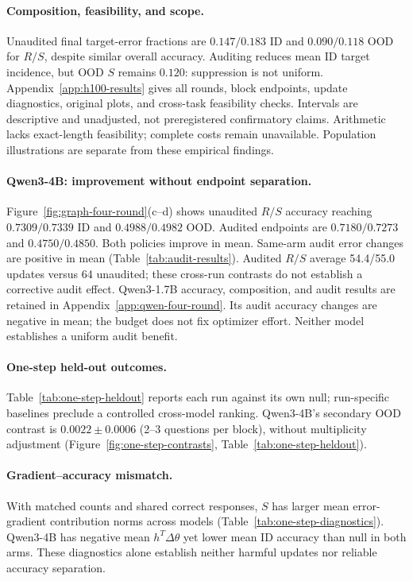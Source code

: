 \paragraph{Composition, feasibility, and scope.}
Unaudited final target-error fractions are $0.147/0.183$ ID and
$0.090/0.118$ OOD for $R/S$, despite similar overall accuracy.
Auditing reduces mean ID target incidence, but OOD $S$ remains $0.120$:
suppression is not uniform. Appendix~\ref{app:h100-results} gives
all rounds, block endpoints, update diagnostics, original plots, and
cross-task feasibility checks. Intervals are descriptive and unadjusted,
not preregistered confirmatory claims. Arithmetic lacks exact-length
feasibility; complete costs remain unavailable.
Population illustrations are separate from these empirical findings.

\paragraph{Qwen3-4B: improvement without endpoint separation.}
Figure~\ref{fig:graph-four-round}(c--d) shows unaudited $R/S$ accuracy reaching
$0.7309/0.7339$ ID and $0.4988/0.4982$ OOD. Audited endpoints are
$0.7180/0.7273$ and $0.4750/0.4850$. Both policies improve in mean.
Same-arm audit error changes are positive
in mean (Table~\ref{tab:audit-results}).
Audited $R/S$ average 54.4/55.0 updates versus 64 unaudited;
these cross-run contrasts do not establish a corrective audit effect.
Qwen3-1.7B accuracy, composition, and audit results are retained in
Appendix~\ref{app:qwen-four-round}. Its audit accuracy changes are negative
in mean; the budget does not fix
optimizer effort. Neither model establishes a uniform audit benefit.
\paragraph{One-step held-out outcomes.}
Table~\ref{tab:one-step-heldout} reports each run against its own null;
run-specific baselines preclude a controlled cross-model ranking.
Qwen3-4B's secondary OOD contrast is $0.0022\pm0.0006$ (2--3 questions
per block), without multiplicity adjustment
(Figure~\ref{fig:one-step-contrasts}, Table~\ref{tab:one-step-heldout}).

\paragraph{Gradient--accuracy mismatch.}
With matched counts and shared correct responses, $S$ has larger mean
error-gradient contribution norms across models
(Table~\ref{tab:one-step-diagnostics}). Qwen3-4B has negative mean
$h^T\Delta\theta$ yet lower mean ID accuracy than null in both arms.
These diagnostics alone establish neither harmful updates nor reliable
accuracy separation.

